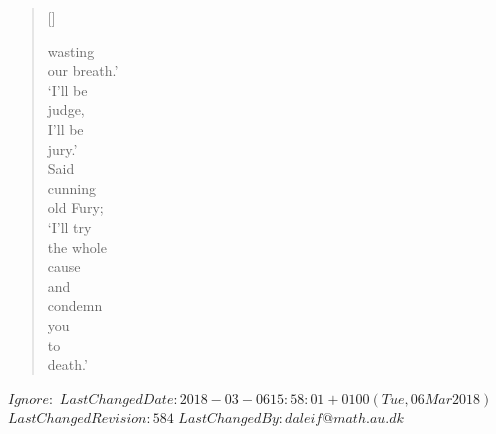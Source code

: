 \begin{verse}[\versewidth]
\begin{patverse}
  wasting \\
  our breath.' \\
\tiny  `I'll be \\
  judge, \\
  I'll be \\
  jury.' \\
  Said \\
  cunning \\
  old Fury; \\
  `I'll try \\
  the whole \\
  cause \\
  and \\
  condemn \\
  you \\
  to \\
  death.'  \par
\end{patverse}
\end{verse}




\svnidlong
{$Ignore: $}
{$LastChangedDate: 2018-03-06 15:58:01 +0100 (Tue, 06 Mar 2018) $}
{$LastChangedRevision: 584 $}
{$LastChangedBy: daleif@math.au.dk $}

